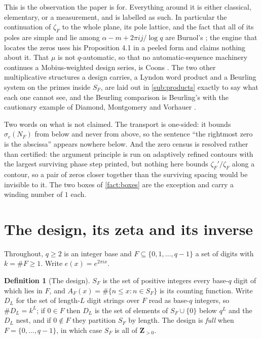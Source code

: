 \documentclass[11pt]{amsart}
\theoremstyle{definition}
\newtheorem{definition}[theorem]{Definition}
\theoremstyle{remark}
\begin{document}
This is the observation the paper is for. Everything around it is either classical, elementary, or a measurement, and is labelled as such. In particular the continuation of $\zeta_{F}$ to the whole plane, its pole lattice, and the fact that all of its poles are simple and lie among $\alpha - m + 2\pi i j/\log q$ are Burnol's \cite{bur}; the engine that locates the zeros uses his Proposition 4.1 in a peeled form and claims nothing about it. That $\mu$ is not $q$-automatic, so that no automatic-sequence machinery continues a Mobius-weighted design series, is Coons \cite{coons}. The two other multiplicative structures a design carries, a Lyndon word product and a Beurling system on the primes inside $S_{F}$, are laid out in \cref{sub:products} exactly to say what each one cannot see, and the Beurling comparison is Beurling's \cite{beur} with the cautionary example of Diamond, Montgomery and Vorhauer \cite{dmv}.

Two words on what is not claimed. The transport is one-sided: it bounds $\sigma_{c}(N_{F})$ from below and never from above, so the sentence ``the rightmost zero is the abscissa'' appears nowhere below. And the zero census is resolved rather than certified: the argument principle is run on adaptively refined contours with the largest surviving phase step printed, but nothing here bounds $\zeta_{F}'/\zeta_{F}$ along a contour, so a pair of zeros closer together than the surviving spacing would be invisible to it. The two boxes of \cref{fact:boxes} are the exception and carry a winding number of $1$ each.

\section{The design, its zeta and its inverse}
\label{sec:defs}

Throughout, $q \ge 2$ is an integer base and $F \subseteq \{0,1,\dots,q-1\}$ a set of digits with $k = \#F \ge 1$. Write $e(x) = e^{2\pi i x}$.

\begin{definition}[The design]
\label{def:design}
$S_{F}$ is the set of positive integers every base-$q$ digit of which lies in $F$, and $A_{F}(x) = \#\{n \le x : n \in S_{F}\}$ is its counting function. Write $D_{L}$ for the set of length-$L$ digit strings over $F$ read as base-$q$ integers, so $\# D_{L} = k^{L}$; if $0 \in F$ then $D_{L}$ is the set of elements of $S_{F} \cup \{0\}$ below $q^{L}$ and the $D_{L}$ nest, and if $0 \notin F$ they partition $S_{F}$ by length. The design is \emph{full} when $F = \{0,\dots,q-1\}$, in which case $S_{F}$ is all of $\mathbf{Z}_{>0}$.
\end{definition}
\end{document}
